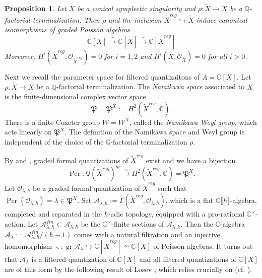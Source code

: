 \documentclass[11pt, a4paper]{amsart}
\newcommand{\C}{\mathbb{C}}
\newcommand{\bQ}{\mathbb{Q}}
\newcommand{\gr}{\operatorname{gr}}
\newcommand{\fP}{\mathfrak{P}}
\newcommand{\cA}{\mathcal{A}}
\newcommand{\hb}{\hbar}
\newcommand{\series}{\llbracket \hb \rrbracket}
\newcommand{\quan}{\mathcal{Q}}
\newcommand{\per}{\operatorname{Per}}
\newcommand{\cm}{\C^\times}
\newcommand{\OO}{\mathcal{O}}
\newtheorem{Prop}[Thm]{Proposition}
\theoremstyle{definition}
\numberwithin{equation}{section}
\begin{document}
\begin{Prop} \label{prop:H_vanishing}
	Let $X$ be a conical symplectic singularity and $\rho: \widetilde{X} \to X$ be a $\bQ$-factorial terminalization. Then $\rho$ and the inclusion $\widetilde{X}^{reg} \hookrightarrow \widetilde{X}$ induce canonical isomorphisms of graded Poisson algebras
	\[ \C[X] \xrightarrow{\sim} \C[\widetilde{X}] \xrightarrow{\sim} \C[\widetilde{X}^{reg}] \]
	Moreover, $H^i(\widetilde{X}^{reg},\OO_{\widetilde{X}^{reg}}) = 0$ for $i = 1, 2$ and $H^i(\widetilde{X},\OO_{\widetilde{X}}) = 0$ for all $i > 0$.
\end{Prop}

Next we recall the parameter space for filtered quantizaitons of $A=\C[X]$.
Let $\rho: \widetilde{X} \to X$ be a $\bQ$-factorial terminalization. The \emph{Namikawa space} associated to $X$ is the finite-dimensional complex vector space
%
\[\fP = \fP^X := H^2(\widetilde{X}^{reg},\C). \]
%
There is a finite Coxeter group $W=W^X$, called the \emph{Namikawa Weyl group}, which acts linearly on $\fP^X$. The definition of the Namikawa space and Weyl group is independent of the choice of the $\bQ$-factorial terminalization $\rho$.

By  and , graded formal quantizations of $\widetilde{X}^{reg}$ exist and we have a bijection 
%
\[ \per: \quan(\widetilde{X}^{reg})^{gr} \xrightarrow{\sim} H^2(\widetilde{X}^{reg},\C) = \fP^X. \]
%
Let $\OO_{\lambda, \hb}$ be a graded formal quantization of $\widetilde{X}^{reg}$ such that $\per(\OO_{\lambda, \hb}) = \lambda \in \fP^X$. Set $\cA_{\lambda, \hb} := \Gamma(\widetilde{X}^{reg},\OO_{\lambda,\hb})$, which is a flat $\C\series$-algebra, completed and separated in the $\hb$-adic topology, equipped with a pro-rational $\cm$-action. Let $\cA_{\lambda,\hb}^{fin} \subset \cA_{\lambda,\hb}$ be the $\cm$-finite sections of $\cA_{\lambda,\hb}$. Then the $\C$-algebra $\cA_{\lambda} := \cA_{\lambda,\hb}^{fin}/(\hb-1)$ comes with a natural filtration and an injective homomorphism $\varsigma: \gr\cA_{\lambda} \hookrightarrow \C[\widetilde{X}^{reg}] \simeq \C[X]$ of Poisson algebras. It turns out that $\cA_{\lambda}$ is a filtered quantization of $\C[X]$ and all filtered quantizations of $\C[X]$ are of this form by the following result of Losev \cite[Proposition 3.3, Theorem 3.4]{Losev:quan_symp_orbit}, which relies crucially on  (cf. \cite[Proposition 3.4]{BPW}).

\end{document}
